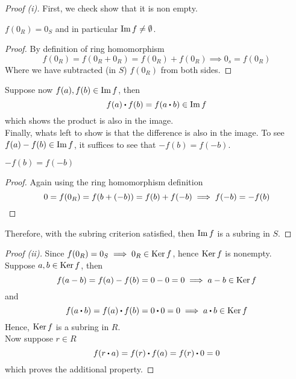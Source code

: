 \documentclass[../Main.tex]{subfiles}
\begin{document}
\begin{proof}[Proof (i)]First, we check show that it is non empty.
	 \begin{claim}
		$f(0_R) = 0_S$ and in particular $\operatorname{Im} f \ne \emptyset$.
		\begin{proof}
			By definition of ring homomorphism
			\[f(0_R)=f(0_R+0_R)=f(0_R)+f(0_R) \implies 0_s = f(0_R)\]
			Where we have subtracted (in $S$) $f(0_R)$ from both sides.
		\end{proof}
	\end{claim}
	Suppose now $f(a), f(b) \in \operatorname{Im} f$, then
	\[f(a)\rdot f(b) = f(a\rdot b) \in \Img f\]
	which shows the product is also in the image.\\
	Finally, whats left to show is that the difference is also in the image.
	To see $f(a)-f(b) \in \operatorname{Im} f$, it suffices to see that $-f(b)=f(-b)$.\\
	\begin{claim}
		$-f(b)=f(-b)$
	\end{claim}
	\begin{proof}
		Again using the ring homomorphism definition
		\[0=f(0_R)=f(b+(-b))=f(b)+f(-b) \implies f(-b)=-f(b)\qedhere\]
	\end{proof}
	Therefore, with the subring criterion satisfied, then $\operatorname{Im} f$ is a subring in $S$.
	\end{proof}
	\begin{proof}[Proof (ii)]
	Since $f(0_R)=0_S \implies 0_R \in \operatorname{Ker} f$, hence $\operatorname{Ker} f$ is nonempty.\\
	Suppose $a,b\in \operatorname{Ker} f$, then
	\[f(a-b) = f(a)-f(b)=0-0=0 \implies a-b \in \operatorname{Ker} f\]
	and
	\[f(a\rdot b) = f(a)\rdot f(b) = 0\rdot 0 = 0 \implies a\rdot b \in \Ker f\]
	Hence, $\operatorname{Ker} f$ is a subring in $R$.\\
	Now suppose $r\in R$
	\[f(r\rdot a)=f(r)\rdot f(a)=f(r)\rdot 0=0\]
	which proves the additional property.
\end{proof}
\end{document}
